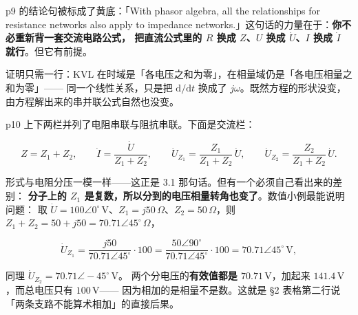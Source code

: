 \documentclass[11pt]{ctexart}
\begin{document}


p9 的结论句被标成了黄底：「With phasor algebra, all the relationships for resistance networks
also apply to impedance networks.」这句话的力量在于：\textbf{你不必重新背一套交流电路公式，
把直流公式里的 $R$ 换成 $Z$、$U$ 换成 $\dot U$、$I$ 换成 $\dot I$ 就行}。但它有前提。


证明只需一行：KVL 在时域是「各电压之和为零」，在相量域仍是「各电压相量之和为零」——
同一个线性关系，只是把 $\mathrm{d}/\mathrm{d}t$ 换成了 $j\omega$。既然方程的形状没变，
由方程解出来的串并联公式自然也没变。


p10 上下两栏并列了电阻串联与阻抗串联。下面是交流栏：

\[ Z=Z_1+Z_2 ,\qquad
   \dot I=\frac{\dot U}{Z_1+Z_2} ,\qquad
   \dot U_{Z_1}=\frac{Z_1}{Z_1+Z_2}\,\dot U ,\qquad
   \dot U_{Z_2}=\frac{Z_2}{Z_1+Z_2}\,\dot U . \]

形式与电阻分压一模一样——这正是 3.1 那句话。但有一个必须自己看出来的差别：
\textbf{分子上的 $Z_1$ 是复数，所以分到的电压相量转角也变了}。数值小例最能说明问题：
取 $\dot U=100\angle0^\circ\,\mathrm{V}$、$Z_1=j50\,\Omega$、$Z_2=50\,\Omega$，则 $Z_1+Z_2=50+j50=70.71\angle45^\circ\,\Omega$，

\[ \dot U_{Z_1}=\frac{j50}{70.71\angle45^\circ}\cdot100
   =\frac{50\angle90^\circ}{70.71\angle45^\circ}\cdot100
   =70.71\angle45^\circ\,\mathrm{V} , \]

同理 $\dot U_{Z_2}=70.71\angle-45^\circ\,\mathrm{V}$。
两个分电压的\textbf{有效值都是 $70.71\,\mathrm{V}$}，加起来 $141.4\,\mathrm{V}$，而总电压只有 $100\,\mathrm{V}$——
因为相加的是相量不是数。这就是 §2 表格第二行说「两条支路不能算术相加」的直接后果。
\end{document}
